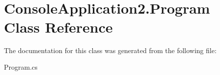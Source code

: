 \hypertarget{class_console_application2_1_1_program}{\section{Console\-Application2.\-Program Class Reference}
\label{class_console_application2_1_1_program}
}


The documentation for this class was generated from the following file\-:\begin{DoxyCompactItemize}
\item 
Program.\-cs\end{DoxyCompactItemize}
